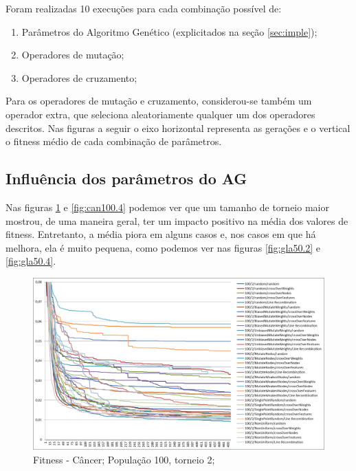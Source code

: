 \documentclass[12pt]{article}
\begin{document}
Foram realizadas 10 execuções para cada combinação possível de:
\begin{enumerate}
\item Parâmetros do Algoritmo Genético (explicitados na seção \ref{sec:imple});
\item Operadores de mutação;
\item Operadores de cruzamento;
\end{enumerate}

Para os operadores de mutação e cruzamento, considerou-se também um operador extra, que seleciona aleatoriamente qualquer um dos operadores descritos. Nas figuras a seguir o eixo horizontal representa as gerações e o vertical o fitness médio de cada combinação de parâmetros.

\subsection{Influência dos parâmetros do AG}\label{res:ag}

Nas figuras \ref{fig:can100.2} e \ref{fig:can100.4} podemos ver que um tamanho de torneio maior mostrou, de uma maneira geral, ter um impacto positivo na média dos valores de fitness. Entretanto, a média piora em alguns casos e, nos casos em que há melhora, ela é muito pequena, como podemos ver nas figuras \ref{fig:gla50.2} e \ref{fig:gla50.4}.

\begin{figure}[htp]
\center
\includegraphics[scale=0.34, keepaspectratio]{cancer_100_2.png} 
\caption{Fitness - Câncer; População 100, torneio 2;}
\label{fig:can100.2}
\end{figure}
\end{document}
